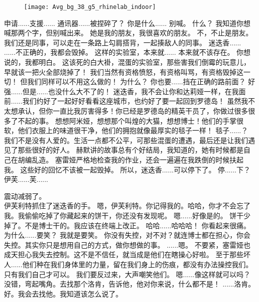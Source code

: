 \documentclass[openany]{book}
\begin{document}
\begin{figure}[h]
    \centering
    \texttt{[image: Avg\_bg\_38\_g5\_rhinelab\_indoor]}
\end{figure}
\begin{dialogue}
     申请......支援......
     通讯器......被捏碎了？
     你是什么......
     别喊。
     什么？
     我知道你想喊那两个字，但别喊出来。
     她是我的朋友，我很喜欢的朋友。
     不，不止是朋友。我们还是同事，可以走在一条路上勾肩搭背，一起揍敌人的同事。
     迷迭香......
     ......不正确的，我都会毁掉。
     这样的实验室，本来就......
     本来就不该存在。
     你想说的，我都明白。
     这该死的白大褂，混蛋的实验室，那些害我们倒霉的玩意儿，早就该一把火全部烧掉了！
     我们当然有资格愤怒，有资格叫骂，有资格毁掉这一切！
     但我们同样可以不用这么做的！
     为什么？
     你也要......挡在正确的路前面？
     好强......但是......也没什么大不了的！
     迷迭香，我不会让你和达莉娅一样，在我面前......我们约好了一起好好看看这座城市，也约好了要一起回到罗德岛！
     虽然我不太想承认，但你一直比我厉害得多！你已经是罗德岛的精英干员了，你做过很多很多了不起的事。
     想想阿米娅，想想那个叫煌的大猫，想想博士！他们的手掌很软，他们衣服上的味道很干净，他们的拥抱就像最厚实的毯子一样！
     毯子......？
     我们不是没有人爱的。生活一点都不公平，可那些混蛋的遭遇，最后还是让我们遇见了那些很好的好人。
     赫默讲的故事总有个好结局，我知道的，她有时候都是自己在胡编乱造。
     塞雷娅严格地检查我的作业，还会一遍遍在我跌倒的时候扶起我。
     这些好的回忆不该被一起毁掉。
     所以，迷迭香......可以停下了。
     停......下？
     伊芙......芙......\par
    震动减弱了。\\
    伊芙利特抓住了迷迭香的手。
     嗯，伊芙利特。你记得我的。哈哈，你才不会忘了我。我偷偷吃掉了你藏起来的饼干，你还没有发现呢。
     嗯......好像是的。
     饼干少掉了。不是博士干的。我应该在终端上改正。
     哈哈......哈哈哈！
     你看起来很痛。为什么......要笑？
     我就是要笑。
     你没有失控，对不对？就连博士都在担心，你会失控。其实你只是想用自己的方式，做你想做的事。
     ......嗯。
     不要紧，塞雷娅也成天担心我失去控制。这不是不信任，就当成是他们在瞎操心好啦。
     至于那些坏人......他们种在我们身体里的力量，留在我们身上的伤痕，都没有办法操控我们。
     只有我们自己才可以。
     我们要反过来，大声嘲笑他们。
     嗯......像这样就可以吗？
     没错，弯起嘴角。去找那个洛肯，告诉他，他对你来说，什么都不是！
     ......洛肯。
     好。我会去找他。我知道该怎么说了。
\end{dialogue}
\end{document}
